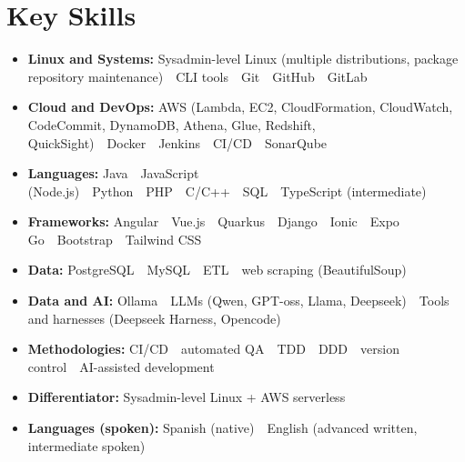 \documentclass[10pt,letterpaper]{article}
\newcommand{\cvskill}[2]{\item \textbf{#1:} #2}
\newcommand{\sep}{\ \textbullet\ }
\begin{document}
\section{Key Skills}
\begin{itemize}
  \cvskill{Linux and Systems}{Sysadmin-level Linux (multiple distributions, package repository maintenance)\sep CLI tools\sep Git\sep GitHub\sep GitLab}
  \cvskill{Cloud and DevOps}{AWS (Lambda, EC2, CloudFormation, CloudWatch, CodeCommit, DynamoDB, Athena, Glue, Redshift, QuickSight)\sep Docker\sep Jenkins\sep CI/CD\sep SonarQube}
  \cvskill{Languages}{Java\sep JavaScript (Node.js)\sep Python\sep PHP\sep C/C++\sep SQL\sep TypeScript (intermediate)}
  \cvskill{Frameworks}{Angular\sep Vue.js\sep Quarkus\sep Django\sep Ionic\sep Expo Go\sep Bootstrap\sep Tailwind CSS}
  \cvskill{Data}{PostgreSQL\sep MySQL\sep ETL\sep web scraping (BeautifulSoup)}
  \cvskill{Data and AI}{Ollama\sep LLMs (Qwen, GPT-oss, Llama, Deepseek)\sep Tools and harnesses (Deepseek Harness, Opencode)}
  \cvskill{Methodologies}{CI/CD\sep automated QA\sep TDD\sep DDD\sep version control\sep AI-assisted development}
  \cvskill{Differentiator}{Sysadmin-level Linux + AWS serverless}
  \cvskill{Languages (spoken)}{Spanish (native)\sep English (advanced written, intermediate spoken)}
\end{itemize}
\end{document}
